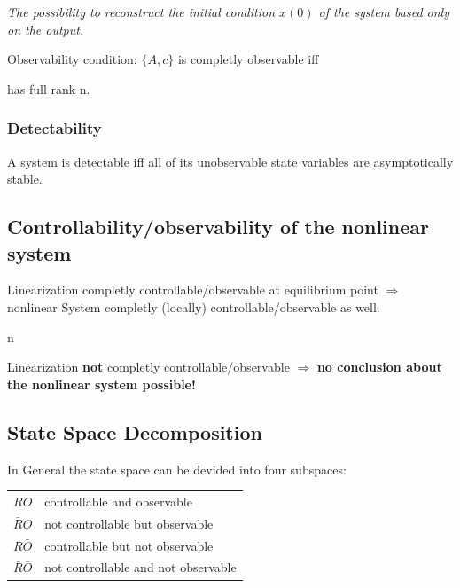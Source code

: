 \documentclass[10pt,a4paper]{scrartcl}
\begin{document}
\begin{multicols*}{3}
	\emph{The possibility to reconstruct the initial condition $x(0)$ of the system based only on the output.}
	
	Observability condition: $\{A,c\}$ is completly observable iff 
	\begin{center}
	 has full rank n.
	\end{center}
	
	
	
	\subsubsection{Detectability}
	
	A system is detectable iff all of its unobservable state variables are asymptotically stable.
	
	
	
	\subsection*{Controllability/observability of the nonlinear system}
	
	Linearization completly controllable/observable at equilibrium point $\Rightarrow$ nonlinear System completly (locally) controllable/observable as well.
	
	n	
	
	Linearization \textbf{not} completly controllable/observable $\Rightarrow$ \textbf{no conclusion about the nonlinear system possible!}
	
		
	
	\subsection{State Space Decomposition}
	
	In General the state space can be devided into four subspaces:	
	
	\begin{tabular}{l@{ : }l}
	$RO$&controllable and observable\\
	$\bar{R}O$&not controllable but observable\\
	$R\bar{O}$&controllable but not observable\\
	$\bar{R}\bar{O}$&not controllable and not observable
	\end{tabular}


\end{multicols*}
\end{document}
